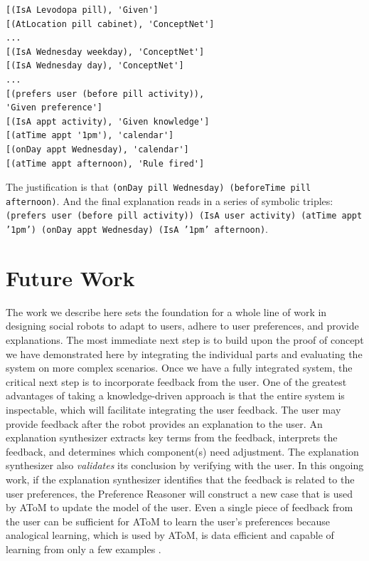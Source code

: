 \documentclass[letterpaper]{article} %
\begin{document}
\small{
\begin{verbatim}
[(IsA Levodopa pill), 'Given']
[(AtLocation pill cabinet), 'ConceptNet']
...
[(IsA Wednesday weekday), 'ConceptNet']
[(IsA Wednesday day), 'ConceptNet']
...
[(prefers user (before pill activity)),
'Given preference']
[(IsA appt activity), 'Given knowledge']
[(atTime appt '1pm'), 'calendar']
[(onDay appt Wednesday), 'calendar']
[(atTime appt afternoon), 'Rule fired']
\end{verbatim}}  The justification is that \texttt{(onDay pill Wednesday) (beforeTime pill  afternoon)}.  And the final explanation reads in a series of symbolic  triples: \texttt{(prefers user (before pill activity)) (IsA user activity) (atTime appt '1pm') (onDay appt Wednesday) (IsA '1pm' afternoon)}.

\vspace{-3.04mm}
\section{Future Work}
The work we describe here sets the foundation for a whole line of work in
designing social robots to adapt to users, adhere to user preferences, and
provide explanations.  The most immediate next step is to build upon the
proof of concept we have demonstrated here by integrating the individual
parts and evaluating the system on more complex scenarios.  Once we have a fully integrated system, the critical next step is to
incorporate feedback from the user.
One of the greatest advantages of taking a knowledge-driven approach is
that the entire system is inspectable, which will facilitate integrating
the user feedback.
The user may provide feedback after the robot provides an explanation to
the user.  An explanation synthesizer extracts key terms from the
feedback, interprets the feedback, and determines which component(s)
need adjustment.  The explanation synthesizer also \emph{validates} its
conclusion by verifying with the user.  In this ongoing work, if the explanation synthesizer identifies that the feedback is related
to the user preferences, the Preference Reasoner will construct a new
case that is used by AToM to update the model of the user.  Even a single
piece of feedback from the user can be sufficient for AToM to learn the
user's preferences because analogical learning, which is used by AToM, is
data efficient and capable of learning from only a few examples
\cite{chen2019human,wilson2019analogical}.
\end{document}
